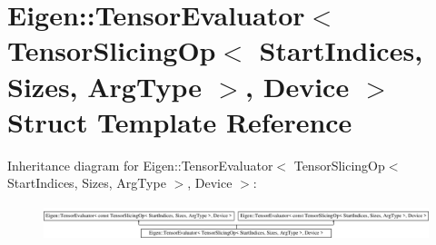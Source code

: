 \hypertarget{struct_eigen_1_1_tensor_evaluator_3_01_tensor_slicing_op_3_01_start_indices_00_01_sizes_00_01_arg_type_01_4_00_01_device_01_4}{}\section{Eigen\+:\+:Tensor\+Evaluator$<$ Tensor\+Slicing\+Op$<$ Start\+Indices, Sizes, Arg\+Type $>$, Device $>$ Struct Template Reference}
\label{struct_eigen_1_1_tensor_evaluator_3_01_tensor_slicing_op_3_01_start_indices_00_01_sizes_00_01_arg_type_01_4_00_01_device_01_4}
Inheritance diagram for Eigen\+:\+:Tensor\+Evaluator$<$ Tensor\+Slicing\+Op$<$ Start\+Indices, Sizes, Arg\+Type $>$, Device $>$\+:\begin{figure}[H]
\begin{center}
\leavevmode
\includegraphics[height=1.037037cm]{struct_eigen_1_1_tensor_evaluator_3_01_tensor_slicing_op_3_01_start_indices_00_01_sizes_00_01_arg_type_01_4_00_01_device_01_4}
\end{center}
\end{figure}
